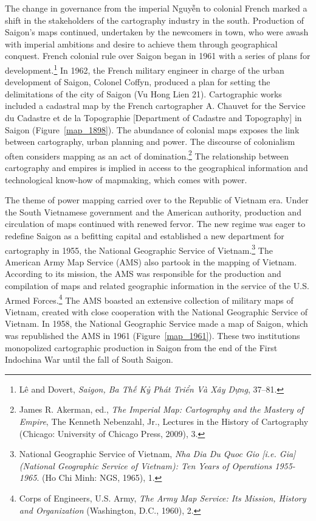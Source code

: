 \vi
The change in governance from the imperial Nguyễn to colonial French marked a shift in the stakeholders of the cartography industry in the south. Production of Saigon’s maps continued, undertaken by the newcomers in town, who were awash with imperial ambitions and desire to achieve them through geographical conquest. French colonial rule over Saigon began in 1961 with a series of plans for development.\footnote{Lê and Dovert, \textit{Saigon, Ba Thế Kỷ Phát Triển Và Xây Dựng}, 37–81.} In 1962, the French military engineer in charge of the urban development of Saigon, Colonel Coffyn, produced a plan for setting the delimitations of the city of Saigon (Vu Hong Lien 21). Cartographic works included a cadastral map by the French cartographer A. Chauvet for the Service du Cadastre et de la Topographie [Department of Cadastre and Topography] in Saigon (Figure~\ref{map_1898}). The abundance of colonial maps exposes the link between cartography, urban planning and power. The discourse of colonialism often considers mapping as an act of domination.\footnote{James R. Akerman, ed., \textit{The Imperial Map: Cartography and the Mastery of Empire}, The Kenneth Nebenzahl, Jr., Lectures in the History of Cartography (Chicago: University of Chicago Press, 2009), 3.} The relationship between cartography and empires is implied in access to the geographical information and technological know-how of mapmaking, which comes with power.

The theme of power mapping carried over to the Republic of Vietnam era. Under the South Vietnamese government and the American authority, production and circulation of maps continued with renewed fervor. The new regime was eager to redefine Saigon as a befitting capital and established a new department for cartography in 1955, the National Geographic Service of Vietnam.\footnote{National Geographic Service of Vietnam, \textit {Nha Dia Du Quoc Gio [i.e. Gia] (National Geographic Service of Vietnam): Ten Years of Operations 1955-1965}. (Ho Chi Minh: NGS, 1965), 1.} The American Army Map Service (AMS) also partook in the mapping of Vietnam. According to its mission, the AMS was responsible for the production and compilation of maps and related geographic information in the service of the U.S. Armed Forces.\footnote{Corps of Engineers, U.S. Army, \textit{The Army Map Service: Its Mission, History and Organization} (Washington, D.C., 1960), 2.} The AMS boasted an extensive collection of military maps of Vietnam, created with close cooperation with the National Geographic Service of Vietnam. In 1958, the National Geographic Service made a map of Saigon, which was republished the AMS in 1961 (Figure~\ref{map_1961}). These two institutions monopolized cartographic production in Saigon from the end of the First Indochina War until the fall of South Saigon.
\en


